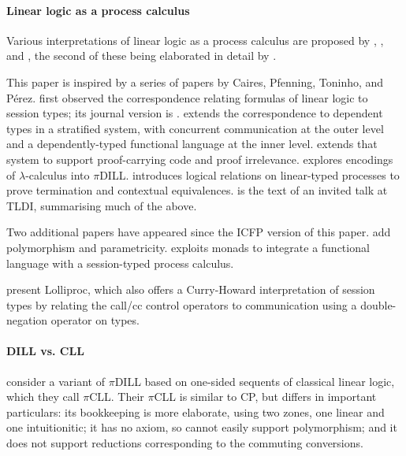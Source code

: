 \documentclass{jfp1}
\begin{document}
\paragraph*{Linear logic as a process calculus}
Various interpretations of linear logic as a process calculus
are proposed by \citet{Abramsky93}, \citet{Abramsky94}, and
\citet{AbramskyEtAl96}, the second of these being elaborated
in detail by \citet{BellinScott94}.

This paper is inspired by a series of papers by Caires, Pfenning,
Toninho, and P\'erez.  \citet{CairesPfenning10} first observed the
correspondence relating formulas of linear logic to session types; its
journal version is \citet{CairesEtAl12b}.  \citet{PfenningEtAl11}
extends the correspondence to dependent types in a stratified system,
with concurrent communication at the outer level and a
dependently-typed functional language at the inner level.
\citet{PfenningEtAl11} extends that system to support proof-carrying
code and proof irrelevance.  \citet{ToninhoEtAl12} explores encodings
of $\lambda$-calculus into $\pi$DILL.  \citet{PerezEtAl12} introduces
logical relations on linear-typed processes to prove termination and
contextual equivalences.  \citet{CairesEtAl12} is the
text of an invited talk at TLDI, summarising much of the above.

Two additional papers have appeared since the ICFP version of this
paper.  \citet{CairesEtAl13} add polymorphism and parametricity.
\citet{ToninhoEtAl13} exploits monads to integrate a functional
language with a session-typed process calculus.

\citet{MazurakZdancewic10} present Lolliproc, which also offers
a Curry-Howard interpretation of session types by relating
the call/cc control operators to communication
using a double-negation operator on types.



\paragraph*{DILL vs. CLL}
\citet{CairesEtAl12b} consider a variant of $\pi$DILL based on
one-sided sequents of classical linear logic, which they call
$\pi$CLL.  Their $\pi$CLL is similar to CP, but differs in important
particulars: its bookkeeping is more elaborate, using two zones, one
linear and one intuitionitic; it has no axiom, so cannot easily
support polymorphism; and it does not support reductions corresponding to
the commuting conversions.
\end{document}
